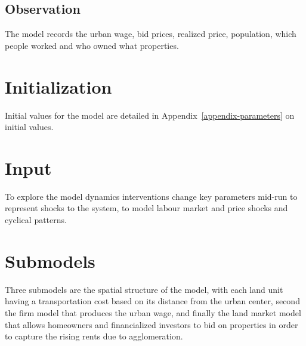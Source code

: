 \subsection{Observation}
The model records the urban wage, bid prices, realized price, population, which people worked and who owned what properties.

\section{Initialization}
Initial values for the model are detailed in Appendix~\ref{appendix-parameters} on initial values.

\section{Input}
To explore the model dynamics interventions change key parameters mid-run to represent shocks to the system, to model labour market and price shocks and cyclical patterns. %

\section{Submodels}
Three submodels are the spatial structure of the model, with each land unit having a transportation cost based on its distance from the urban center, second the firm model that produces the urban wage, and finally the land market model that allows homeowners and financialized investors to bid on properties in order to capture the rising rents due to agglomeration.  
